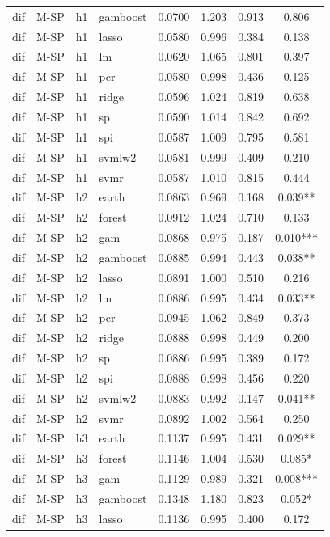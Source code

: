 \begin{ThreePartTable}
\begin{longtable}[t]{llclcccc}
dif & M-SP & h1 & gamboost & 0.0700 & 1.203 & 0.913 & 0.806\\
dif & M-SP & h1 & lasso & 0.0580 & 0.996 & 0.384 & 0.138\\
dif & M-SP & h1 & lm & 0.0620 & 1.065 & 0.801 & 0.397\\
dif & M-SP & h1 & pcr & 0.0580 & 0.998 & 0.436 & 0.125\\
dif & M-SP & h1 & ridge & 0.0596 & 1.024 & 0.819 & 0.638\\
dif & M-SP & h1 & sp & 0.0590 & 1.014 & 0.842 & 0.692\\
dif & M-SP & h1 & spi & 0.0587 & 1.009 & 0.795 & 0.581\\
dif & M-SP & h1 & svmlw2 & 0.0581 & 0.999 & 0.409 & 0.210\\
dif & M-SP & h1 & svmr & 0.0587 & 1.010 & 0.815 & 0.444\\
\addlinespace
dif & M-SP & h2 & earth & 0.0863 & 0.969 & 0.168 & 0.039**\\
dif & M-SP & h2 & forest & 0.0912 & 1.024 & 0.710 & 0.133\\
dif & M-SP & h2 & gam & 0.0868 & 0.975 & 0.187 & 0.010***\\
dif & M-SP & h2 & gamboost & 0.0885 & 0.994 & 0.443 & 0.038**\\
dif & M-SP & h2 & lasso & 0.0891 & 1.000 & 0.510 & 0.216\\
dif & M-SP & h2 & lm & 0.0886 & 0.995 & 0.434 & 0.033**\\
dif & M-SP & h2 & pcr & 0.0945 & 1.062 & 0.849 & 0.373\\
dif & M-SP & h2 & ridge & 0.0888 & 0.998 & 0.449 & 0.200\\
dif & M-SP & h2 & sp & 0.0886 & 0.995 & 0.389 & 0.172\\
dif & M-SP & h2 & spi & 0.0888 & 0.998 & 0.456 & 0.220\\
dif & M-SP & h2 & svmlw2 & 0.0883 & 0.992 & 0.147 & 0.041**\\
dif & M-SP & h2 & svmr & 0.0892 & 1.002 & 0.564 & 0.250\\
\addlinespace
dif & M-SP & h3 & earth & 0.1137 & 0.995 & 0.431 & 0.029**\\
dif & M-SP & h3 & forest & 0.1146 & 1.004 & 0.530 & 0.085*\\
dif & M-SP & h3 & gam & 0.1129 & 0.989 & 0.321 & 0.008***\\
dif & M-SP & h3 & gamboost & 0.1348 & 1.180 & 0.823 & 0.052*\\
dif & M-SP & h3 & lasso & 0.1136 & 0.995 & 0.400 & 0.172\\

\end{longtable}
\end{ThreePartTable}
